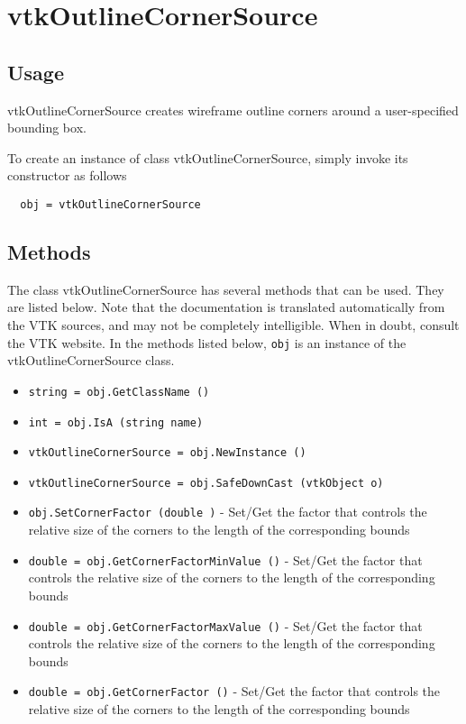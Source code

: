 \section{vtkOutlineCornerSource}

\subsection{Usage}

 vtkOutlineCornerSource creates wireframe outline corners around a user-specified 
 bounding box.

To create an instance of class vtkOutlineCornerSource, simply
invoke its constructor as follows
\begin{verbatim}
  obj = vtkOutlineCornerSource
\end{verbatim}
\subsection{Methods}

The class vtkOutlineCornerSource has several methods that can be used.
  They are listed below.
Note that the documentation is translated automatically from the VTK sources,
and may not be completely intelligible.  When in doubt, consult the VTK website.
In the methods listed below, \verb|obj| is an instance of the vtkOutlineCornerSource class.
\begin{itemize}
\item  \verb|string = obj.GetClassName ()|

\item  \verb|int = obj.IsA (string name)|

\item  \verb|vtkOutlineCornerSource = obj.NewInstance ()|

\item  \verb|vtkOutlineCornerSource = obj.SafeDownCast (vtkObject o)|

\item  \verb|obj.SetCornerFactor (double )| -  Set/Get the factor that controls the relative size of the corners
 to the length of the corresponding bounds

\item  \verb|double = obj.GetCornerFactorMinValue ()| -  Set/Get the factor that controls the relative size of the corners
 to the length of the corresponding bounds

\item  \verb|double = obj.GetCornerFactorMaxValue ()| -  Set/Get the factor that controls the relative size of the corners
 to the length of the corresponding bounds

\item  \verb|double = obj.GetCornerFactor ()| -  Set/Get the factor that controls the relative size of the corners
 to the length of the corresponding bounds

\end{itemize}
